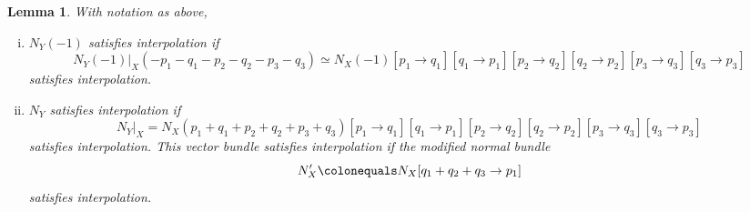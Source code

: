 \documentclass[11pt]{amsart}
\newtheorem{lem}[thm]{Lemma}
\theoremstyle{definition}
\theoremstyle{remark}
\begin{document}
\begin{lem}\label{3_secant}
With notation as above, 
\begin{enumerate}[(i)]
\item $N_Y(-1)$ satisfies interpolation if 
\[N_Y(-1)|_X(-p_1-q_1-p_2-q_2 -p_3-q_3) \simeq N_X(-1)[p_1 \to q_1][q_1 \to p_1][p_2 \to q_2][q_2 \to p_2][p_3 \to q_3][q_3 \to p_3] \]
satisfies interpolation.
\item $N_Y$ satisfies interpolation if 
\[ N_Y|_X = N_X(p_1+q_1+p_2+q_2 +p_3+q_3)[p_1 \to q_1][q_1 \to p_1][p_2 \to q_2][q_2 \to p_2][p_3 \to q_3][q_3 \to p_3] \]
satisfies interpolation.  This vector bundle satisfies interpolation if the modified normal bundle
\[N_X' \colonequals N_X[q_1 + q_2 + q_3 \to p_1 ] \]
satisfies interpolation.
\end{enumerate}
\end{lem}
\end{document}
